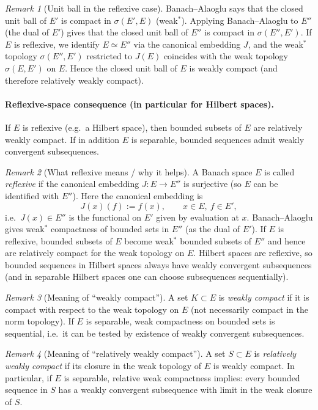 \documentclass[11pt]{article}
\theoremstyle{definition}
\theoremstyle{remark}
\newtheorem{remark}{Remark}
\begin{document}
\begin{remark}[Unit ball in the reflexive case]
Banach--Alaoglu says that the closed unit ball of $E'$ is compact in $\sigma(E',E)$ (weak$^\ast$). Applying Banach--Alaoglu to $E''$ (the dual of $E'$) gives that the closed unit ball of $E''$ is compact in $\sigma(E'',E')$.
If $E$ is reflexive, we identify $E\simeq E''$ via the canonical embedding $J$, and the weak$^\ast$ topology $\sigma(E'',E')$ restricted to $J(E)$ coincides with the weak topology $\sigma(E,E')$ on $E$. Hence the closed unit ball of $E$ is weakly compact (and therefore relatively weakly compact).
\end{remark}

\paragraph{Reflexive-space consequence (in particular for Hilbert spaces).}
If $E$ is reflexive (e.g.\ a Hilbert space), then bounded subsets of $E$ are relatively weakly compact.
If in addition $E$ is separable, bounded sequences admit weakly convergent subsequences.

\begin{remark}[What reflexive means / why it helps]
A Banach space $E$ is called \emph{reflexive} if the canonical embedding $J\colon E\to E''$ is surjective (so $E$ can be identified with $E''$). Here the canonical embedding is
\[
J(x)(f):=f(x),
\qquad x\in E,\ f\in E',
\]
i.e.\ $J(x)\in E''$ is the functional on $E'$ given by evaluation at $x$.
Banach--Alaoglu gives weak$^\ast$ compactness of bounded sets in $E''$ (as the dual of $E'$). If $E$ is reflexive, bounded subsets of $E$ become weak$^\ast$ bounded subsets of $E''$ and hence are relatively compact for the weak topology on $E$.
Hilbert spaces are reflexive, so bounded sequences in Hilbert spaces always have weakly convergent subsequences (and in separable Hilbert spaces one can choose subsequences sequentially).
\end{remark}

\begin{remark}[Meaning of ``weakly compact'']
A set $K\subset E$ is \emph{weakly compact} if it is compact with respect to the weak topology on $E$ (not necessarily compact in the norm topology).
If $E$ is separable, weak compactness on bounded sets is sequential, i.e.\ it can be tested by existence of weakly convergent subsequences.
\end{remark}

\begin{remark}[Meaning of ``relatively weakly compact'']
A set $S\subset E$ is \emph{relatively weakly compact} if its closure in the weak topology of $E$ is weakly compact.
In particular, if $E$ is separable, relative weak compactness implies: every bounded sequence in $S$ has a weakly convergent subsequence with limit in the weak closure of $S$.
\end{remark}
\end{document}
